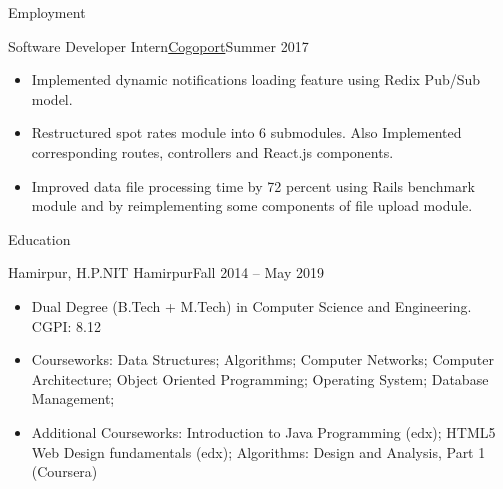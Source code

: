 \documentclass[]{mcdowellcv}
\begin{document}
	\makeheader
	
	\begin{cvsection}{Employment}
		\begin{cvsubsection}{Software Developer Intern}{\href {http://www.cogoport.com/}{Cogoport}}{Summer 2017}			
			\begin{itemize}
				\item Implemented dynamic notifications loading feature using Redix Pub/Sub model.
				\item Restructured spot rates module into 6 submodules. Also Implemented corresponding routes, controllers and React.js components.
				\item Improved data file processing time by 72 percent using Rails benchmark module and by reimplementing some components of file upload module.
			\end{itemize}
		\end{cvsubsection}
	\end{cvsection}
	
	\begin{cvsection}{Education}
		\begin{cvsubsection}{Hamirpur, H.P.}{NIT Hamirpur}{Fall 2014 -- May 2019}
			\begin{itemize}
				\item Dual Degree (B.Tech + M.Tech) in Computer Science and Engineering. CGPI: 8.12
				\item Courseworks: Data Structures; Algorithms; Computer Networks; Computer Architecture; Object Oriented Programming; Operating System; Database Management; 
				\item Additional Courseworks: Introduction to Java Programming (edx); HTML5 Web Design fundamentals (edx); Algorithms: Design and Analysis, Part 1 (Coursera)
			\end{itemize}
		\end{cvsubsection}
	\end{cvsection}
	
\end{document}
